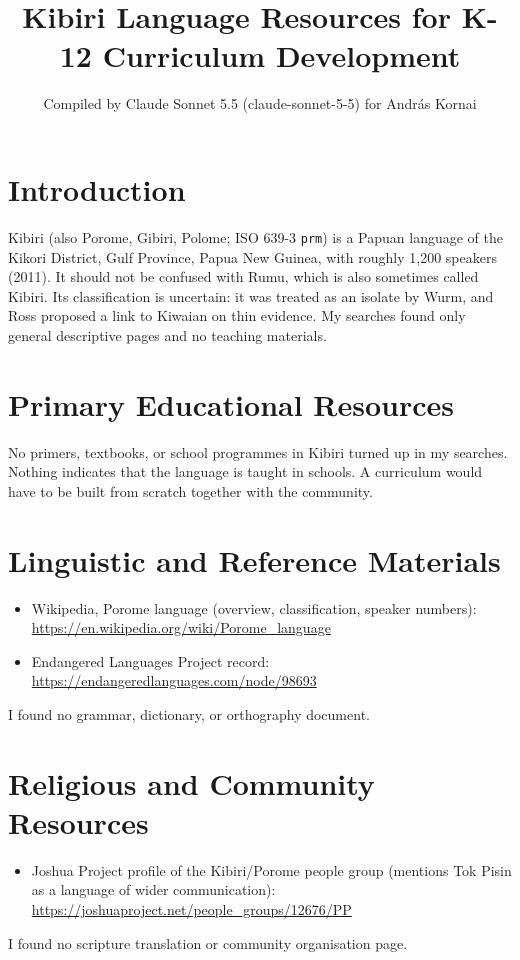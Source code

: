\documentclass[12pt]{article}
\title{Kibiri Language Resources for K-12 Curriculum Development}
\author{Compiled by Claude Sonnet 5.5 (claude-sonnet-5-5) for Andr\'as Kornai}
\date{}
\begin{document}
\maketitle

\section{Introduction}
Kibiri (also Porome, Gibiri, Polome; ISO 639-3 \texttt{prm}) is a Papuan language of the Kikori District, Gulf Province, Papua New Guinea, with roughly 1,200 speakers (2011). It should not be confused with Rumu, which is also sometimes called Kibiri. Its classification is uncertain: it was treated as an isolate by Wurm, and Ross proposed a link to Kiwaian on thin evidence. My searches found only general descriptive pages and no teaching materials.

\section{Primary Educational Resources}
No primers, textbooks, or school programmes in Kibiri turned up in my searches. Nothing indicates that the language is taught in schools. A curriculum would have to be built from scratch together with the community.

\section{Linguistic and Reference Materials}
\begin{itemize}
\item Wikipedia, Porome language (overview, classification, speaker numbers): \url{https://en.wikipedia.org/wiki/Porome_language}
\item Endangered Languages Project record: \url{https://endangeredlanguages.com/node/98693}
\end{itemize}
I found no grammar, dictionary, or orthography document.

\section{Religious and Community Resources}
\begin{itemize}
\item Joshua Project profile of the Kibiri/Porome people group (mentions Tok Pisin as a language of wider communication): \url{https://joshuaproject.net/people_groups/12676/PP}
\end{itemize}
I found no scripture translation or community organisation page.
\end{document}
